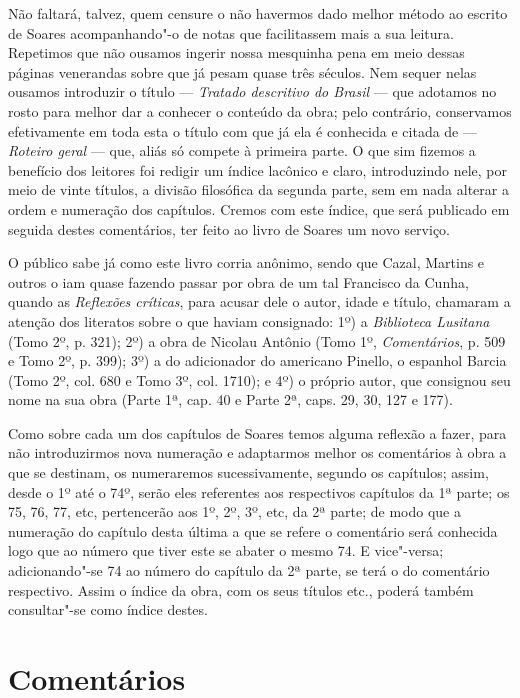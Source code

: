 Não faltará, talvez, quem censure o não havermos dado melhor 
método ao escrito de Soares acompanhando"-o de notas que facilitassem 
mais a sua leitura. Repetimos que não ousamos ingerir nossa 
mesquinha pena em meio dessas páginas venerandas sobre que já 
pesam quase três séculos. Nem sequer nelas ousamos introduzir o título 
--- \textit{Tratado descritivo do Brasil} --- que adotamos no rosto para melhor 
dar a conhecer o conteúdo da obra; pelo contrário, conservamos 
efetivamente em toda esta o título com que já ela é conhecida e citada de 
--- \textit{Roteiro geral} --- que, aliás só compete à primeira parte. O que sim 
fizemos a benefício dos leitores foi redigir um índice lacônico e claro, 
introduzindo nele, por meio de vinte títulos, a divisão filosófica da 
segunda parte, sem em nada alterar a ordem e numeração dos capítulos. 
Cremos com este índice, que será publicado em seguida destes 
comentários, ter feito ao livro de Soares um novo serviço.

O público sabe já como este livro corria anônimo, sendo que Cazal, 
Martins e outros o iam quase fazendo passar por obra de um tal 
Francisco da Cunha, quando as \textit{Reflexões críticas}, para acusar dele o 
autor, idade e título, chamaram a atenção dos literatos sobre o que 
haviam consignado: 1º) a \textit{Biblioteca Lusitana} (Tomo 2º, p. 321); 2º) a 
obra de Nicolau Antônio (Tomo 1º, \textit{Comentários},
p. 509 e Tomo 2º, p. 399); 3º) a do adicionador do americano Pinello, 
o espanhol Barcia (Tomo 2º, col. 680 e Tomo 3º, col. 1710); e 4º) o 
próprio autor, que consignou seu nome na sua obra (Parte 1ª, cap. 40 e 
Parte 2ª, caps. 29, 30, 127 e 177).

Como sobre cada um dos capítulos de Soares temos alguma 
reflexão a fazer, para não introduzirmos nova numeração e adaptarmos 
melhor os comentários à obra a que se destinam, os numeraremos 
sucessivamente, segundo os capítulos; assim, desde o 1º até o 74º, 
serão eles referentes aos respectivos capítulos da 1ª parte; os 75, 76, 77, 
etc, pertencerão aos 1º, 2º, 3º, etc, da 2ª parte; de modo que a 
numeração do capítulo desta última a que se refere o comentário será 
conhecida logo que ao número que tiver este se abater o mesmo 74. E 
vice"-versa; adicionando"-se 74 ao número do capítulo da 2ª parte, se 
terá o do comentário respectivo. Assim o índice da obra, com os seus 
títulos etc., poderá também consultar"-se como índice destes.

\section{Comentários}
\medskip

